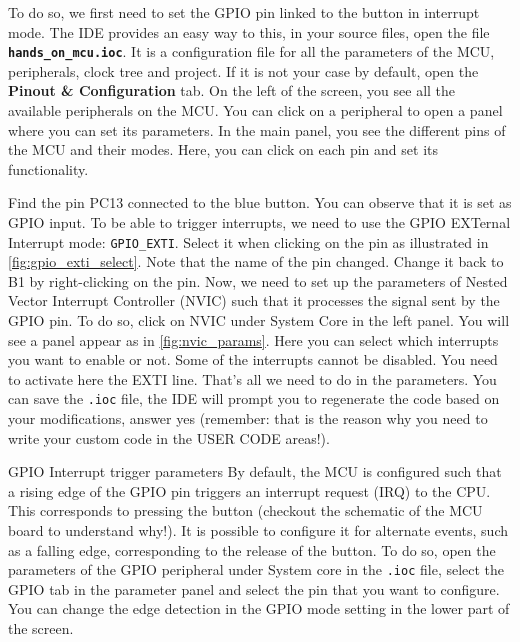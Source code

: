 To do so, we first need to set the GPIO pin linked to the button in interrupt mode. The IDE provides an easy way to this, in your source files, open the file \textbf{\texttt{hands\_on\_mcu.ioc}}. It is a configuration file for all the parameters of the MCU, peripherals, clock tree and project. If it is not your case by default, open the \textbf{Pinout \& Configuration} tab. On the left of the screen, you see all the available peripherals on the MCU. You can click on a peripheral to open a panel where you can set its parameters. In the main panel, you see the different pins of the MCU and their modes. Here, you can click on each pin and set its functionality.

Find the pin PC13 connected to the blue button. You can observe that it is set as GPIO input. To be able to trigger interrupts, we need to use the GPIO EXTernal Interrupt mode: \texttt{GPIO\_EXTI}. Select it when clicking on the pin as illustrated in \autoref{fig:gpio_exti_select}. Note that the name of the pin changed. Change it back to B1 by right-clicking on the pin. Now, we need to set up the parameters of Nested Vector Interrupt Controller (NVIC) such that it processes the signal sent by the GPIO pin. To do so, click on NVIC under System Core in the left panel. You will see a panel appear as in \autoref{fig:nvic_params}. Here you can select which interrupts you want to enable or not. Some of the interrupts cannot be disabled. You need to activate here the EXTI line. That's all we need to do in the parameters. You can save the \texttt{.ioc} file, the IDE will prompt you to regenerate the code based on your modifications, answer yes (remember: that is the reason why you need to write your custom code in the USER CODE areas!).

\begin{bclogo}[couleur = gray!20, arrondi = 0.2, logo=\bcinfo]{GPIO Interrupt trigger parameters}
By default, the MCU is configured such that a rising edge of the GPIO pin triggers an interrupt request (IRQ) to the CPU. This corresponds to pressing the button (checkout the schematic of the MCU board to understand why!). It is possible to configure it for alternate events, such as a falling edge, corresponding to the release of the button. To do so, open the parameters of the GPIO peripheral under System core in the \texttt{.ioc} file, select the GPIO tab in the parameter panel and select the pin that you want to configure. You can change the edge detection in the GPIO mode setting in the lower part of the screen.
\end{bclogo}

